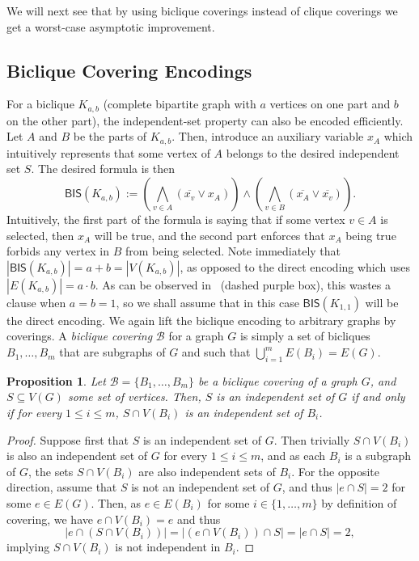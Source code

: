 \documentclass[11pt]{article}
\newtheorem{proposition}[theorem]{Proposition}
\begin{document}
We will next see that by using biclique coverings instead of clique coverings we get a worst-case asymptotic improvement.

\subsection{Biclique Covering Encodings}
For a biclique $K_{a, b}$ (complete bipartite graph with $a$ vertices on one part and $b$ on the other part), the independent-set property can also be encoded efficiently. Let $A$ and $B$ be the parts of $K_{a, b}$. Then, introduce an auxiliary variable $x_A$  which intuitively represents that some vertex of $A$ belongs to the desired independent set $S$. The desired formula is then
\begin{equation}\label{eq:biclique_encoding}
\textsf{BIS}(K_{a, b}) := \left(\bigwedge_{v \in A}(\overline{x_v} \lor x_A)\right) \land \left(\bigwedge_{v \in B}(\overline{x_A} \lor \overline{x_v}) \right).
\end{equation}
Intuitively, the first part of the formula is saying that if some vertex $v \in A$ is selected, then $x_A$ will be true, and the second part enforces that $x_A$ being true forbids any vertex in $B$ from being selected.
Note immediately that $|\textsf{BIS}(K_{a, b})| = a + b = |V(K_{a, b})|$, as opposed to the direct encoding which uses $|E(K_{a, b})| = a \cdot b$. As can be observed in~ (dashed purple box), this wastes a clause when $a = b = 1$, so we shall assume that in this case $\textsf{BIS}(K_{1, 1})$ will be the direct encoding. 
We again lift the biclique encoding to arbitrary graphs by coverings. A \emph{biclique covering} $\mathcal{B}$ for a graph $G$ is simply a set of bicliques $B_1, \ldots, B_m$ that are subgraphs of $G$ and such that $\bigcup_{i=1}^m E(B_i) = E(G)$.
\begin{proposition}\label{prop:biclique-independence}
    Let $\mathcal{B} = \{B_1, \ldots, B_m\}$ be a biclique covering of a graph $G$, and $S \subseteq V(G)$ some set of vertices. Then, $S$ is an independent set of $G$ if and only if for every $1 \leq i \leq m$, $S \cap V(B_i)$ is an independent set of $B_i$.
\end{proposition}
\begin{proof}
    Suppose first that $S$ is an independent set of $G$. Then trivially $S \cap V(B_i)$ is also an independent set of $G$ for every $1 \leq i \leq m$, and as each $B_i$ is a subgraph of $G$, the sets $S \cap V(B_i)$ are also independent sets of $B_i$.
    For the opposite direction, assume that $S$ is not an independent set of $G$, and thus $|e \cap S| = 2$ for some $e \in E(G)$. Then, as $e \in E(B_i)$ for some $i \in \{1, \ldots, m\}$ by definition of covering, we have $e \cap V(B_i) = e$ and thus
    \[
    |e \cap (S \cap V(B_i))| = |(e \cap V(B_i)) \cap S| = |e \cap S| = 2,
    \]
    implying $S \cap V(B_i)$ is not independent in $B_i$.
\end{proof}
\end{document}
